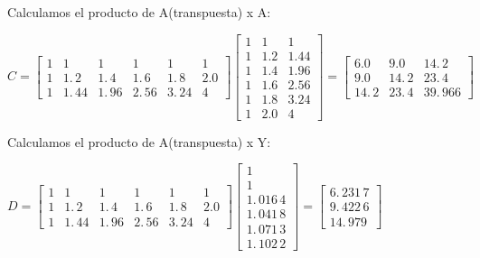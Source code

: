 \documentclass{article}
\begin{document}
Calculamos el producto de A(transpuesta) x A:

$C=\left[ 
\begin{array}{cccccc}
1 & 1 & 1 & 1 & 1 & 1 \\ 
1 & 1.\,\allowbreak 2 & 1.\,\allowbreak 4 & 1.\,\allowbreak 6 & 
1.\,\allowbreak 8 & 2.0 \\ 
1 & 1.\,\allowbreak 44 & 1.\,\allowbreak 96 & 2.\,\allowbreak 56 & 
3.\,\allowbreak 24 & 4%
\end{array}%
\right] \left[ 
\begin{array}{ccc}
1 & 1 & 1 \\ 
1 & 1.2 & 1.44 \\ 
1 & 1.4 & 1.96 \\ 
1 & 1.6 & 2.56 \\ 
1 & 1.8 & 3.24 \\ 
1 & 2.0 & 4%
\end{array}%
\right] =\allowbreak \left[ 
\begin{array}{ccc}
6.0 & 9.0 & 14.\,\allowbreak 2 \\ 
9.0 & 14.\,\allowbreak 2 & 23.\,\allowbreak 4 \\ 
14.\,\allowbreak 2 & 23.\,\allowbreak 4 & 39.\,\allowbreak 966%
\end{array}%
\right] \allowbreak $

\bigskip

Calculamos el producto de A(transpuesta) x Y:

$D=\left[ 
\begin{array}{cccccc}
1 & 1 & 1 & 1 & 1 & 1 \\ 
1 & 1.\,\allowbreak 2 & 1.\,\allowbreak 4 & 1.\,\allowbreak 6 & 
1.\,\allowbreak 8 & 2.0 \\ 
1 & 1.\,\allowbreak 44 & 1.\,\allowbreak 96 & 2.\,\allowbreak 56 & 
3.\,\allowbreak 24 & 4%
\end{array}%
\right] \left[ 
\begin{array}{c}
1 \\ 
1 \\ 
1.\,\allowbreak 016\,4 \\ 
1.\,\allowbreak 041\,8 \\ 
1.\,\allowbreak 071\,3 \\ 
1.\,\allowbreak 102\,2%
\end{array}%
\right] =\allowbreak \left[ 
\begin{array}{c}
6.\,\allowbreak 231\,7 \\ 
9.\,\allowbreak 422\,6 \\ 
14.\,\allowbreak 979%
\end{array}%
\right] $
\end{document}
